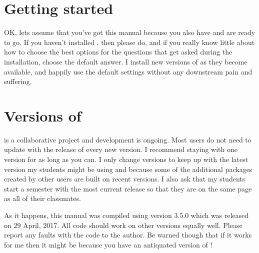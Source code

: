 \section{Getting started} 
 
OK, lets assume that you've got this manual because you also have \R{} and are ready to go. If you haven't installed \R{}, then please do, and if you really know little about how to choose the best options for the questions that get asked during the installation, choose the default answer. I install new versions of \R{} as they become available, and happily use the default settings without any downstream pain and suffering. 
 
\section{Versions of \R{}} 
 
\R{} is a collaborative project and development is ongoing. Most users do not need to update \R{} with the release of every new version. I recommend staying with one \R{} version for as long as you can. I only change versions to keep up with the latest version my students might be using and because some of the additional packages created by other \R{} users are built on recent versions.  I also ask that my students start a semester with the most current release so that they are on the same page as all of their classmates.

 
As it happens, this manual was compiled using version 3.5.0 which was released on 29 April, 2017. All code should work on other versions equally well. Please report any faults with the code to the author. Be warned though that if it works for me then it might be because you have an antiquated version of \R{}! 
 


